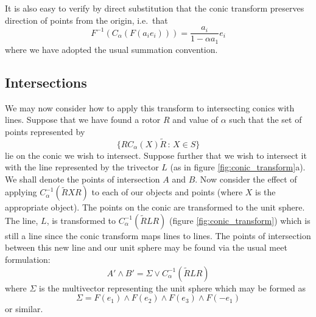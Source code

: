 It is also easy to verify by direct substitution
that the conic transform preserves direction of points from the
origin, i.e.\ that
\[
F^{-1}(C_\alpha(F( a_ie_i ))) =
	 \frac{a_i}{1 - \alpha a_1} e_i
\]
where we have adopted the usual summation convention.

\subsection{Intersections}

We may now consider how to apply this transform to intersecting conics
with lines. Suppose that we have found a rotor $R$ and value of 
$\alpha$ such that the set of points represented by
\[
\{ RC_\alpha(X)\tilde{R}\,:\,X \in S\}
\]
lie on the conic we wish to intersect. Suppose further that we wish to 
intersect it with the line represented by the trivector $L$ (as in
figure \ref{fig:conic_transform}a). We shall denote the 
points of intersection $A$ and $B$. Now consider
the effect of applying $C_\alpha^{-1}(\tilde{R} X R)$ to each of our 
objects and
points (where $X$ is the appropriate object). 
The points on the conic are transformed to the unit sphere. The line, $L$,
is transformed to $C_\alpha^{-1}(\tilde{R}LR)$ (figure \ref{fig:conic_transform}) which is still a line since the
conic transform maps lines to lines. 
The points of intersection between
this new line and our unit sphere may be found via the usual meet
formulation:
\[
A' \wedge B' = \Sigma \vee C_\alpha^{-1}(\tilde{R}LR)
\]
where $\Sigma$ is the multivector representing the unit sphere which may
be formed as 
\[
\Sigma = F(e_1) \wedge F(e_2) \wedge F(e_3) \wedge F(-e_1) %
\]
or similar.

